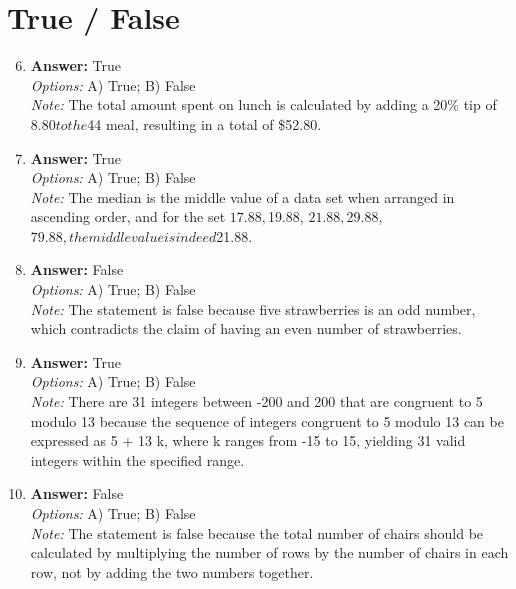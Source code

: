 \documentclass[12pt]{article}
\begin{document}
\section*{True / False}
\begin{enumerate}[label=\arabic*.]
\setcounter{enumi}{5}
\item \textbf{Answer:} True
\\ \textit{Options:} A) True; B) False
\\ \textit{Note:} The total amount spent on lunch is calculated by adding a 20\% tip of $8.80 to the $44 meal, resulting in a total of \$52.80.
\item \textbf{Answer:} True
\\ \textit{Options:} A) True; B) False
\\ \textit{Note:} The median is the middle value of a data set when arranged in ascending order, and for the set $17.88, $19.88, $21.88, $29.88, $79.88, the middle value is indeed $21.88.
\item \textbf{Answer:} False
\\ \textit{Options:} A) True; B) False
\\ \textit{Note:} The statement is false because five strawberries is an odd number, which contradicts the claim of having an even number of strawberries.
\item \textbf{Answer:} True
\\ \textit{Options:} A) True; B) False
\\ \textit{Note:} There are 31 integers between -200 and 200 that are congruent to 5 modulo 13 because the sequence of integers congruent to 5 modulo 13 can be expressed as 5 + 13 k, where k ranges from -15 to 15, yielding 31 valid integers within the specified range.
\item \textbf{Answer:} False
\\ \textit{Options:} A) True; B) False
\\ \textit{Note:} The statement is false because the total number of chairs should be calculated by multiplying the number of rows by the number of chairs in each row, not by adding the two numbers together.
\end{enumerate}
\end{document}
